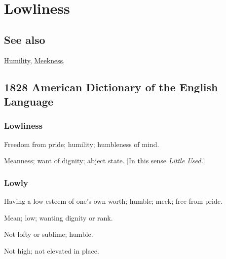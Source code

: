 \section{Lowliness}
	\label{LOWLINESS}
	
\subsection{See also}

	\hyperref[HUMILITY]{Humility}, \hyperref[MEEKNESS]{Meekness},

\subsection{1828 American Dictionary of the English Language} %
	\label{LOWLINESS-1828}
	
	\subsubsection{Lowliness}

		\begin{compactitem}
			\item[1] Freedom from pride; humility; humbleness of mind.
			\item[2] Meanness; want of dignity; abject state. [In this sense \textit{Little Used.}]
		\end{compactitem}
		
	\subsubsection{Lowly}

		\begin{compactitem}
			\item[1] Having a low esteem of one's own worth; humble; meek; free from pride.
			\item[2] Mean; low; wanting dignity or rank.
			\item[3] Not lofty or sublime; humble.
			\item[4] Not high; not elevated in place.
		\end{compactitem}


